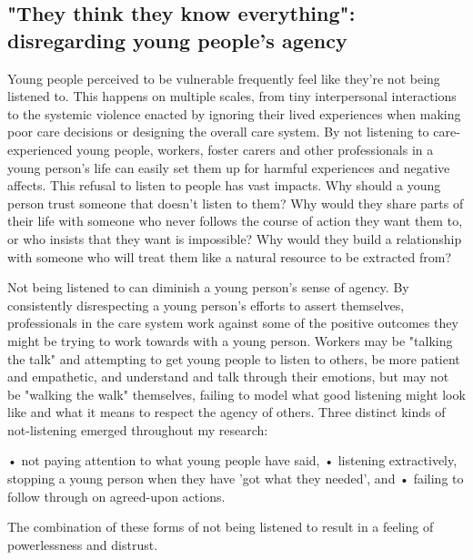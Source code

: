 \subsection{"They think they know everything": disregarding young people's agency}
Young people perceived to be vulnerable frequently feel like they're not being listened to. This happens on multiple scales, from tiny interpersonal interactions to the systemic violence enacted by ignoring their lived experiences when making poor care decisions or designing the overall care system. By not listening to care-experienced young people, workers, foster carers and other professionals in a young person's life can easily set them up for harmful experiences and negative affects. This refusal to listen to people has vast impacts. Why should a young person trust someone that doesn't listen to them? Why would they share parts of their life with someone who never follows the course of action they want them to, or who insists that they want is impossible? Why would they build a relationship with someone who will treat them like a natural resource to be extracted from?

Not being listened to can diminish a young person's sense of agency. By consistently disrespecting a young person's efforts to assert themselves, professionals in the care system work against some of the positive outcomes they might be trying to work towards with a young person. Workers may be "talking the talk" and attempting to get young people to listen to others, be more patient and empathetic, and understand and talk through their emotions, but may not be "walking the walk" themselves, failing to model what good listening might look like and what it means to respect the agency of others. Three distinct kinds of not-listening emerged throughout my research:

•	not paying attention to what young people have said,
•	listening extractively, stopping a young person when they have 'got what they needed', and
•	failing to follow through on agreed-upon actions.

The combination of these forms of not being listened to result in a feeling of powerlessness and distrust.

